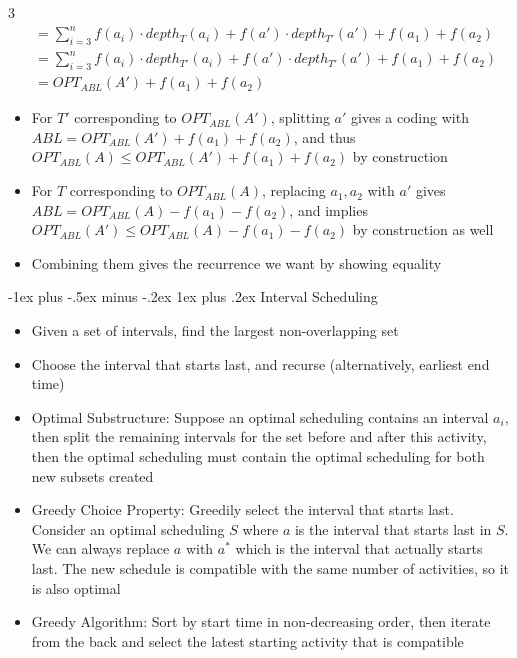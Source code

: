 \documentclass[10pt, landscape]{article}
\makeatletter
\renewcommand{\subsection}{\@startsection{subsection}{3}{0mm}%
                                {-1ex plus -.5ex minus -.2ex}%
                                {1ex plus .2ex}%
                                {\normalfont\small\bfseries}}%
\makeatother
\begin{document}
\begin{multicols*}{3}
{\begin{align*}
    &= \sum_{i=3}^n f(a_i) \cdot depth_T(a_i)+f(a') \cdot depth_{T'}(a')+f(a_1)+f(a_2) \\
    &= \sum_{i=3}^n f(a_i) \cdot depth_{T'}(a_i) + f(a') \cdot depth_{T'}(a') + f(a_1)+f(a_2) \\
    &= OPT_{ABL}(A')+f(a_1)+f(a_2)
\end{align*}
}
\begin{itemize}
    \item For $T'$ corresponding to $OPT_{ABL}(A')$, splitting $a'$ gives a coding with $ABL=OPT_{ABL}(A')+f(a_1)+f(a_2)$, and thus $OPT_{ABL}(A)\leq OPT_{ABL}(A')+f(a_1)+f(a_2)$ by construction
    \item For $T$ corresponding to $OPT_{ABL}(A)$, replacing $a_1,a_2$ with $a'$ gives $ABL=OPT_{ABL}(A)-f(a_1)-f(a_2)$, and implies $OPT_{ABL}(A')\leq OPT_{ABL}(A)-f(a_1)-f(a_2)$ by construction as well
    \item Combining them gives the recurrence we want by showing equality
\end{itemize}

\subsection{Interval Scheduling}
\begin{itemize}
    \item Given a set of intervals, find the largest non-overlapping set
    \item Choose the interval that starts last, and recurse (alternatively, earliest end time)
    \item Optimal Substructure: Suppose an optimal scheduling contains an interval $a_i$, then split the remaining intervals for the set before and after this activity, then the optimal scheduling must contain the optimal scheduling for both new subsets created
    \item Greedy Choice Property: Greedily select the interval that starts last. Consider an optimal scheduling $S$ where $a$ is the interval that starts last in $S$. We can always replace $a$ with $a^*$ which is the interval that actually starts last. The new schedule is compatible with the same number of activities, so it is also optimal
    \item Greedy Algorithm: Sort by start time in non-decreasing order, then iterate from the back and select the latest starting activity that is compatible
\end{itemize}


\end{multicols*}
\end{document}

